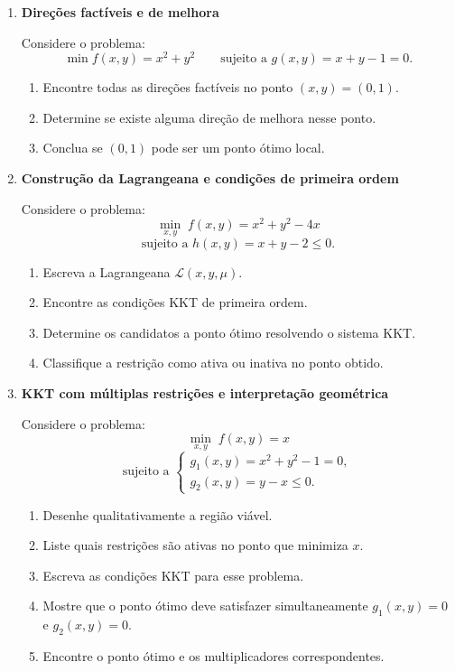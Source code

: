 \documentclass[9pt,a4paper]{extarticle}
\begin{document}
\begin{enumerate}
\item \textbf{Direções factíveis e de melhora}

Considere o problema:
\[
\min f(x,y)=x^2+y^2 
\qquad \text{sujeito a } 
g(x,y)=x+y-1=0.
\]

\begin{enumerate}
    \item Encontre todas as direções factíveis no ponto $(x,y)=(0,1)$.
    \item Determine se existe alguma direção de melhora nesse ponto.
    \item Conclua se $(0,1)$ pode ser um ponto ótimo local.
\end{enumerate}


\item \textbf{Construção da Lagrangeana e condições de primeira ordem}

Considere o problema:
\[
\min_{x,y} \; f(x,y) = x^2 + y^2 - 4x
\]
\[
\text{sujeito a } h(x,y)=x+y-2\le 0.
\]

\begin{enumerate}
    \item Escreva a Lagrangeana $\mathcal{L}(x,y,\mu)$.
    \item Encontre as condições KKT de primeira ordem.
    \item Determine os candidatos a ponto ótimo resolvendo o sistema KKT.
    \item Classifique a restrição como ativa ou inativa no ponto obtido.
\end{enumerate}


\item \textbf{KKT com múltiplas restrições e interpretação geométrica}

Considere o problema:
\[
\min_{x,y} \; f(x,y) = x 
\]
\[
\text{sujeito a }
\begin{cases}
g_1(x,y)=x^2+y^2-1=0, \\
g_2(x,y)=y- x \le 0.
\end{cases}
\]

\begin{enumerate}
    \item Desenhe qualitativamente a região viável.
    \item Liste quais restrições são ativas no ponto que minimiza $x$.
    \item Escreva as condições KKT para esse problema.
    \item Mostre que o ponto ótimo deve satisfazer simultaneamente $g_1(x,y)=0$ e $g_2(x,y)=0$.
    \item Encontre o ponto ótimo e os multiplicadores correspondentes.
\end{enumerate}



\end{enumerate}
\end{document}
